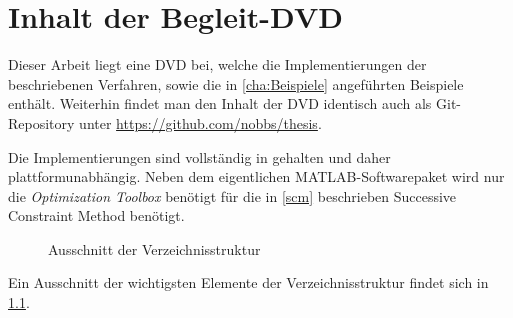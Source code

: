 \documentclass[../main.tex]{subfiles}
\begin{document}
\chapter{Inhalt der Begleit-DVD} %
\label{cha:inhalt_der_begleit_dvd}

Dieser Arbeit liegt eine DVD bei, welche die Implementierungen der beschriebenen Verfahren, sowie die in \cref{cha:Beispiele} angeführten Beispiele enthält.
Weiterhin findet man den Inhalt der DVD identisch auch als Git-Repository unter \url{https://github.com/nobbs/thesis}.

Die Implementierungen sind vollständig in \textcite{Matlab} gehalten und daher plattformunabhängig.
Neben dem eigentlichen MATLAB-Softwarepaket wird nur die \emph{Optimization Toolbox} benötigt für die in \cref{scm} beschrieben Successive Constraint Method benötigt.

\begin{figure}[tb]
    \caption{Ausschnitt der Verzeichnisstruktur}
    \label{fig:dvd}
\end{figure}

Ein Ausschnitt der wichtigsten Elemente der Verzeichnisstruktur findet sich in \cref{fig:dvd}.
\end{document}
